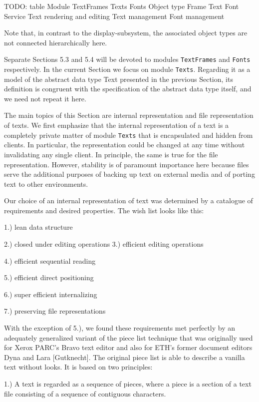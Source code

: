 TODO: table
Module
TextFrames Texts
Fonts
Object type
Frame Text Font
Service
Text rendering and editing Text management
Font management

Note that, in contrast to the display-subsystem, the associated object
types are not connected hierarchically here.

Separate Sections 5.3 and 5.4 will be devoted to modules {\tt TextFrames\/}
and {\tt Fonts\/} respectively. In the current Section
we focus on module {\tt Texts\/}. Regarding it as a model of the
abstract data type Text presented in the previous Section, its
definition is congruent with the specification of the abstract data
type itself, and we need not repeat it here.

The main topics of this Section are internal representation and file
representation of texts. We first emphasize that the internal
representation of a text is a completely private matter of module
{\tt Texts\/} that is encapsulated and hidden from clients. In particular, the
representation could be changed at any time without invalidating any
single client. In principle, the same is true for the file
representation. However, stability is of paramount importance here
because files serve the additional purposes of backing up text on
external media and of porting text to other environments.

Our choice of an internal representation of text was determined by a catalogue of requirements and desired properties. The wish list looks like this:

1.) lean data structure

2.) closed under editing operations 3.) efficient editing operations

4.) efficient sequential reading

5.) efficient direct positioning

6.) super efficient internalizing

7.) preserving file representations

\noindent With the exception of 5.), we found these requirements met
perfectly by an adequately generalized variant of the piece list
technique that was originally used for Xerox PARC's Bravo text editor
and also for ETH's former document editors Dyna and Lara
[Gutknecht]. The original piece list is able to describe a vanilla
text without looks. It is based on two principles:


1.) A text is regarded as a sequence of pieces, where a piece is a
section of a text file consisting of a sequence of contiguous
characters.

